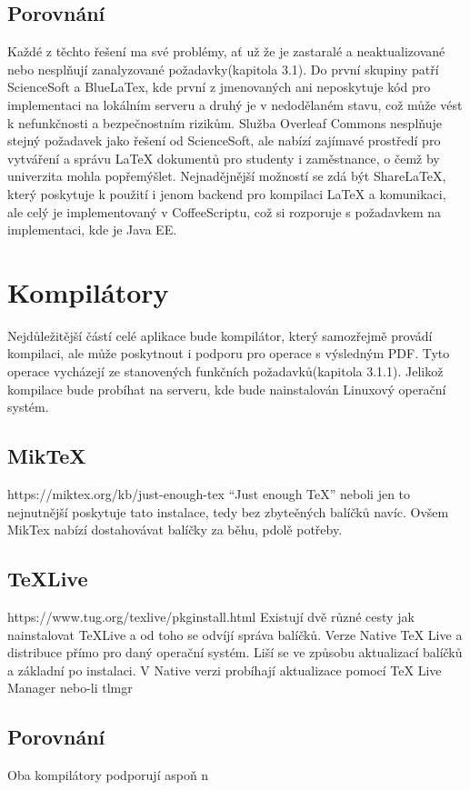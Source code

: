 \subsection{Porovnání}
Každé z těchto řešení ma své problémy, ať už že je zastaralé a neaktualizované nebo nesplňují zanalyzované požadavky(kapitola 3.1). Do první skupiny patří ScienceSoft a BlueLaTex, kde první z jmenovaných ani neposkytuje kód pro implementaci na lokálním serveru a druhý je v nedodělaném stavu, což může vést k nefunkčnosti a bezpečnostním rizikům. Služba Overleaf Commons nesplňuje stejný požadavek jako řešení od ScienceSoft, ale nabízí zajímavé prostředí pro vytváření a správu LaTeX dokumentů pro studenty i zaměstnance, o čemž by univerzita mohla popřemýšlet. Nejnadějnější možností se zdá být ShareLaTeX, který poskytuje k použití i jenom backend pro kompilaci LaTeX a komunikaci, ale celý je implementovaný v CoffeeScriptu, což si rozporuje s požadavkem na implementaci, kde je Java EE. 

\section{Kompilátory}
Nejdůležitější částí celé aplikace bude kompilátor, který samozřejmě provádí kompilaci, ale může poskytnout i podporu pro operace s výsledným PDF. Tyto operace vycházejí ze stanovených funkčních požadavků(kapitola 3.1.1). Jelikož kompilace bude probíhat na serveru, kde bude nainstalován Linuxový operační systém.

\subsection{MikTeX}
https://miktex.org/kb/just-enough-tex
“Just enough TeX” neboli jen to nejnutnější poskytuje tato instalace, tedy bez zbyteěných balíčků navíc. Ovšem MikTex nabízí dostahovávat balíčky za běhu, pdolě potřeby.

\subsection{TeXLive}
https://www.tug.org/texlive/pkginstall.html
Existují dvě různé cesty jak nainstalovat TeXLive a od toho se odvíjí správa balíčků. Verze Native TeX Live a distribuce přímo pro daný operační systém. Liší se ve způsobu aktualizací balíčků a základní po instalaci. V Native verzi probíhají aktualizace pomocí TeX Live Manager nebo-li tlmgr 

\subsection{Porovnání}
Oba kompilátory podporují aspoň n
